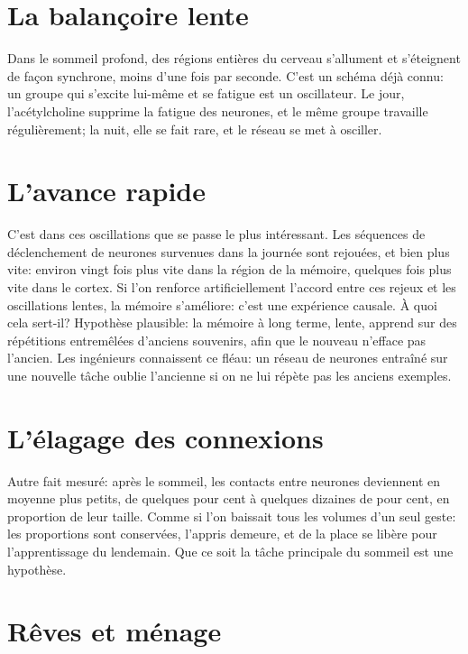 \section*{La balançoire lente}

Dans le sommeil profond, des régions entières du cerveau s'allument et s'éteignent de façon synchrone, moins d'une fois par seconde. C'est un schéma déjà connu: un groupe qui s'excite lui-même et se fatigue est un oscillateur. Le jour, l'acétylcholine supprime la fatigue des neurones, et le même groupe travaille régulièrement; la nuit, elle se fait rare, et le réseau se met à osciller.


\section*{L'avance rapide}

C'est dans ces oscillations que se passe le plus intéressant. Les séquences de déclenchement de neurones survenues dans la journée sont \og rejouées\fg{}, et bien plus vite: environ vingt fois plus vite dans la région de la mémoire, quelques fois plus vite dans le cortex. Si l'on renforce artificiellement l'accord entre ces rejeux et les oscillations lentes, la mémoire s'améliore: c'est une expérience causale. À quoi cela sert-il? Hypothèse plausible: la mémoire à long terme, lente, apprend sur des répétitions entremêlées d'anciens souvenirs, afin que le nouveau n'efface pas l'ancien. Les ingénieurs connaissent ce fléau: un réseau de neurones entraîné sur une nouvelle tâche oublie l'ancienne si on ne lui répète pas les anciens exemples.

\section*{L'élagage des connexions}

Autre fait mesuré: après le sommeil, les contacts entre neurones deviennent en moyenne plus petits, de quelques pour cent à quelques dizaines de pour cent, en proportion de leur taille. Comme si l'on baissait tous les volumes d'un seul geste: les proportions sont conservées, l'appris demeure, et de la place se libère pour l'apprentissage du lendemain. Que ce soit la tâche principale du sommeil est une hypothèse.

\section*{Rêves et ménage}

